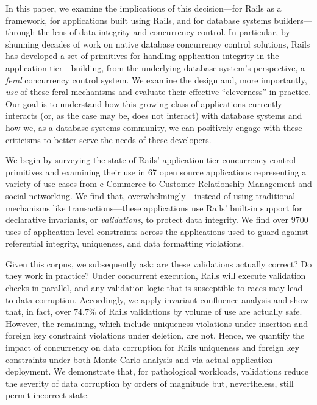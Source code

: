 In this paper, we examine the implications of this decision---for
Rails as a framework, for applications built using Rails, and for
database systems builders---through the lens of data integrity and
concurrency control. In particular, by shunning decades of work on
native database concurrency control solutions, Rails has developed a
set of primitives for handling application integrity in the
application tier---building, from the underlying database system's
perspective, a \textit{feral} concurrency control system. We examine
the design and, more importantly, \textit{use} of these feral
mechanisms and evaluate their effective ``cleverness'' in
practice. Our goal is to understand how this growing class of
applications currently interacts (or, as the case may be, does not
interact) with database systems and how we, as a database systems
community, we can positively engage with these criticisms to better
serve the needs of these developers.

We begin by surveying the state of Rails' application-tier concurrency
control primitives and examining their use in 67 open source
applications representing a variety of use cases from e-Commerce to
Customer Relationship Management and social networking. We find that,
overwhelmingly---instead of using traditional mechanisms like
transactions---these applications use Rails' built-in support for
declarative invariants, or \textit{validations}, to protect data
integrity. We find over $9700$ uses of application-level constraints
across the applications used to guard against referential integrity,
uniqueness, and data formatting violations.

Given this corpus, we subsequently ask: are these validations actually
correct? Do they work in practice? Under concurrent execution, Rails
will execute validation checks in parallel, and any validation logic
that is susceptible to races may lead to data corruption. Accordingly,
we apply invariant confluence analysis and show that, in fact, over
$74.7\%$ of Rails validations by volume of use are actually
safe. However, the remaining, which include uniqueness violations
under insertion and foreign key constraint violations under deletion,
are not. Hence, we quantify the impact of concurrency on data
corruption for Rails uniqueness and foreign key constraints under both
Monte Carlo analysis and via actual application deployment. We
demonstrate that, for pathological workloads, validations reduce the
severity of data corruption by orders of magnitude but, nevertheless,
still permit incorrect state.

